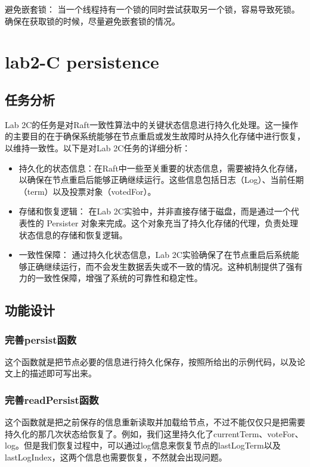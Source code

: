 \documentclass[]{article}
\begin{document}
	避免嵌套锁： 当一个线程持有一个锁的同时尝试获取另一个锁，容易导致死锁。确保在获取锁的时候，尽量避免嵌套锁的情况。
	
	\section{lab2-C persistence}
	\subsection{任务分析}
	Lab 2C的任务是对Raft一致性算法中的关键状态信息进行持久化处理。这一操作的主要目的在于确保系统能够在节点重启或发生故障时从持久化存储中进行恢复，以维持一致性。以下是对Lab 2C任务的详细分析：
	\begin{itemize}
	\item 持久化的状态信息：在Raft中一些至关重要的状态信息，需要被持久化存储，以确保在节点重启后能够正确继续运行。这些信息包括日志（Log）、当前任期（term）以及投票对象（votedFor）。
	
	\item 存储和恢复逻辑： 在Lab 2C实验中，并非直接存储于磁盘，而是通过一个代表性的 Persister 对象来完成。这个对象充当了持久化存储的代理，负责处理状态信息的存储和恢复逻辑。
	
	\item 一致性保障： 通过持久化状态信息，Lab 2C实验确保了在节点重启后系统能够正确继续运行，而不会发生数据丢失或不一致的情况。这种机制提供了强有力的一致性保障，增强了系统的可靠性和稳定性。
	\end{itemize}

	\subsection{功能设计}
	\subsubsection{完善persist函数}
	这个函数就是把节点必要的信息进行持久化保存，按照所给出的示例代码，以及论文上的描述即可写出来。
	\subsubsection{完善readPersist函数}
	这个函数就是把之前保存的信息重新读取并加载给节点，不过不能仅仅只是把需要持久化的那几次状态给恢复了。例如，我们这里持久化了currentTerm、voteFor、log。但是我们恢复过程中，可以通过log信息来恢复节点的lastLogTerm以及lastLogIndex，这两个信息也需要恢复，不然就会出现问题。
\end{document}
